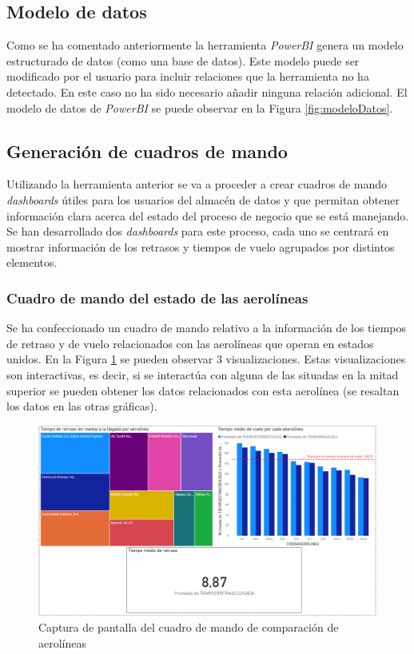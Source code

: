\documentclass{article}
\begin{document}
\newpage
\subsection{Modelo de datos}

Como se ha comentado anteriormente la herramienta \textit{PowerBI} genera un modelo estructurado de datos (como una base de datos). Este modelo puede ser modificado por el usuario para incluir relaciones que la herramienta no ha detectado. En este caso no ha sido necesario añadir ninguna relación adicional. El modelo de datos de \textit{PowerBI} se puede observar en la Figura \ref{fig:modeloDatos}.\\


\subsection{Generación de cuadros de mando}

Utilizando la herramienta anterior se va a proceder a crear cuadros de mando \textit{dashboards} útiles para los usuarios del almacén de datos y que permitan obtener información clara acerca del estado del proceso de negocio que se está manejando. Se han desarrollado dos \textit{dashboards} para este proceso, cada uno se centrará en mostrar información de los retrasos y tiempos de vuelo agrupados por distintos elementos.\\

\subsubsection{Cuadro de mando del estado de las aerolíneas}

Se ha confeccionado un cuadro de mando relativo a la información de los tiempos de retraso y de vuelo relacionados con las aerolíneas que operan en estados unidos. En la Figura \ref{fig:dashboardAerolineas} se pueden observar 3 visualizaciones. Estas visualizaciones son interactivas, es decir, si se interactúa con alguna de las situadas en la mitad superior se pueden obtener los datos relacionados con esta aerolínea (se resaltan los datos en las otras gráficas).\\

\begin{figure}[h!]
    \centering
    \includegraphics[scale=0.5]{images/cuadroPedro.png}
    \caption{Captura de pantalla del cuadro de mando de comparación de aerolíneas}
    \label{fig:dashboardAerolineas}
\end{figure}
\end{document}
